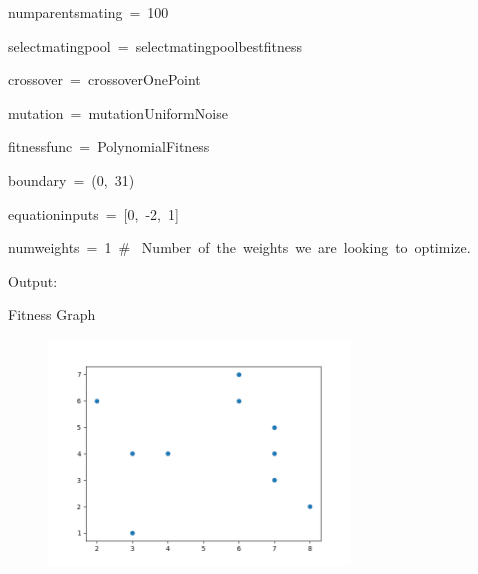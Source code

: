 \documentclass[12pt]{article}
\renewcommand{\_}{\kern-1.5pt\textunderscore\kern-1.5pt}
\begin{document}
{\fontsize{10pt}{12.0pt}\selectfont \textcolor[HTML]{D4D4D4}{num\_parents\_mating = 100}\par}\par

{\fontsize{10pt}{12.0pt}\selectfont \textcolor[HTML]{D4D4D4}{select\_mating\_pool = select\_mating\_pool\_bestfitness}\par}\par

{\fontsize{10pt}{12.0pt}\selectfont \textcolor[HTML]{D4D4D4}{crossover = crossover\_OnePoint}\par}\par

{\fontsize{10pt}{12.0pt}\selectfont \textcolor[HTML]{D4D4D4}{mutation = mutation\_UniformNoise}\par}\par

{\fontsize{10pt}{12.0pt}\selectfont \textcolor[HTML]{D4D4D4}{fitness\_func = PolynomialFitness}\par}\par

{\fontsize{10pt}{12.0pt}\selectfont \textcolor[HTML]{D4D4D4}{boundary = (0, 31)}\par}\par

{\fontsize{10pt}{12.0pt}\selectfont \textcolor[HTML]{D4D4D4}{equation\_inputs = [0, -2, 1]}\par}\par

{\fontsize{10pt}{12.0pt}\selectfont \textcolor[HTML]{D4D4D4}{num\_weights = 1 $\#$  Number of the weights we are looking to optimize.}\par}\par


\vspace{\baselineskip}
{\fontsize{14pt}{16.8pt}\selectfont Output:\par}\par

Fitness Graph\par




\begin{figure}[H]
	\begin{Center}
		\includegraphics[width=3.16in,height=2.37in]{./media/image4.png}
	\end{Center}
\end{figure}
\end{document}

